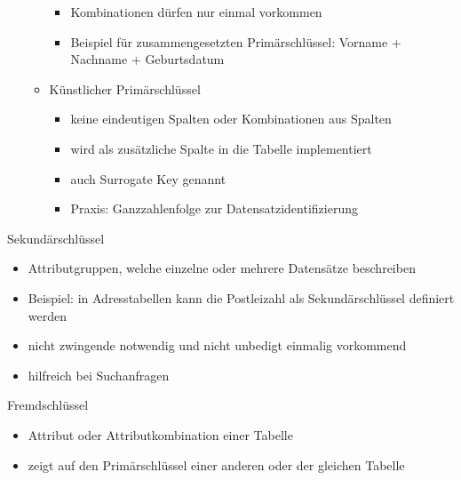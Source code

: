 \documentclass[12pt,a4paper]{report}
\begin{document}
\begin{onehalfspace}
\begin{itemize}
\begin{itemize}
\begin{itemize}
\item Kombinationen dürfen nur einmal vorkommen
\item Beispiel für zusammengesetzten Primärschlüssel: Vorname + Nachname + Geburtsdatum
\end{itemize}
\item Künstlicher Primärschlüssel
\begin{itemize}
\item keine eindeutigen Spalten oder Kombinationen aus Spalten
\item wird als zusätzliche Spalte in die Tabelle implementiert
\item auch Surrogate Key genannt
\item Praxis: Ganzzahlenfolge zur Datensatzidentifizierung
\end{itemize}
\end{itemize}
\end{itemize}
Sekundärschlüssel
\begin{itemize}
\item Attributgruppen, welche einzelne oder mehrere Datensätze beschreiben
\item Beispiel: in Adresstabellen kann die Postleizahl als Sekundärschlüssel definiert werden
\item nicht zwingende notwendig und nicht unbedigt einmalig vorkommend
\item hilfreich bei Suchanfragen
\end{itemize}
Fremdschlüssel
\begin{itemize}
\item Attribut oder Attributkombination einer Tabelle
\item zeigt auf den Primärschlüssel einer anderen oder der gleichen Tabelle
\end{itemize}


\end{onehalfspace}
\end{document}
